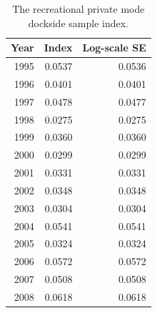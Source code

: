 \documentclass[12pt,]{article}
\begin{document}
\begin{table}[ht]
\centering
\caption{The recreational private mode 
                                            dockside sample index.} 
\label{tab:Fleet9_GillnetSurvey_index}
\begin{tabular}{rrr}
  \hline
Year & Index & Log-scale SE \\ 
  \hline
 1995 & 0.0537 & 0.0536 \\ 
   1996 & 0.0401 & 0.0401 \\ 
   1997 & 0.0478 & 0.0477 \\ 
   1998 & 0.0275 & 0.0275 \\ 
   1999 & 0.0360 & 0.0360 \\ 
   2000 & 0.0299 & 0.0299 \\ 
   2001 & 0.0331 & 0.0331 \\ 
   2002 & 0.0348 & 0.0348 \\ 
   2003 & 0.0304 & 0.0304 \\ 
   2004 & 0.0541 & 0.0541 \\ 
   2005 & 0.0324 & 0.0324 \\ 
   2006 & 0.0572 & 0.0572 \\ 
   2007 & 0.0508 & 0.0508 \\ 
   2008 & 0.0618 & 0.0618 \\ 
   \hline
\end{tabular}
\end{table}

\FloatBarrier

\vspace{2in}
\end{document}
